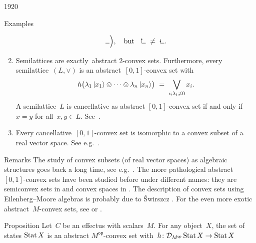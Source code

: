 \begin{parsec}{1920}
\begin{point}{50}{Examples}
\begin{enumerate}
\begin{equation*}
{\begin{tikzpicture}[scale=0.2]
    \draw (1,0) -- (0,0) ; 
\end{tikzpicture}
}\Bigr), \quad\text{but}\quad
        \begin{tikzpicture}[scale=0.2]
    \filldraw( 0,1) circle (3pt);
    \draw (0,0) -- (0,1) ; 
    \draw (1,0) -- (0,0) ; 
\end{tikzpicture} \ \neq \ 
        \begin{tikzpicture}[scale=0.2]
    \filldraw( 0,.5) circle (3pt);
    \draw (0,0) -- (0,1) ; 
    \draw (1,0) -- (0,0) ; 
\end{tikzpicture}.
\end{equation*}
\item
Semilattices are exactly~abstract $2$-convex sets.
Furthermore, every semilattice~$(L, \vee)$
    is an abstract~$[0,1]$-convex set
    with
    \begin{equation*}
    h\bigl(\lambda_1 \ket{x_1} \ovee \cdots \ovee \lambda_n \ket{x_n}\bigr)
        \ =\  \bigvee_{i; \lambda_i \neq 0} x_i.
    \end{equation*}
    A semilattice~$L$ is cancellative as abstract $[0,1]$-convex set
    if and only if~$x=y$ for all~$x,y\in L$.
    See~\cite{neumann1970quasivariety}.
\item
Every cancellative~$[0,1]$-convex set
    is isomorphic to a convex subset of a real vector space.
    See e.g.~\cite[Thm.~8]{statesofconvexsets}.
\end{enumerate}
\begin{point}{60}{Remarks}%
The study of
    convex subsets (of real vector spaces)
    as algebraic structures goes back a long time,
        see e.g.~\cite{stone1949postulates,neumann1970quasivariety,flood1981semiconvex,tz2009convex,gudder1979general}.
The more pathological abstract~$[0,1]$-convex sets have been studied before
    under different names:
    they are semiconvex sets in \cite{flood1981semiconvex,swirszcz1975monadic} and
    convex spaces in \cite{tz2009convex}.
The description of convex sets using Eilenberg--Moore algebras is probably
    due to \'Swirszcz \cite{swirszcz1975monadic}.
For the even more exotic abstract~$M$-convex
    sets, see \cite{effintro} or
        \cite{probdistrconv}.
\end{point}
\end{point}
\begin{point}{70}{Proposition}%
Let~$C$ be an effectus with scalars~$M$.
For any object~$X$, the set of states
$\operatorname{Stat} X$ is an abstract $M^{\mathsf{op}}$-convex set
with~$h\colon \mathcal{D}_{M^{\mathsf{op}}} \operatorname{Stat} X \to \operatorname{Stat} X$

\end{point}
\end{parsec}
